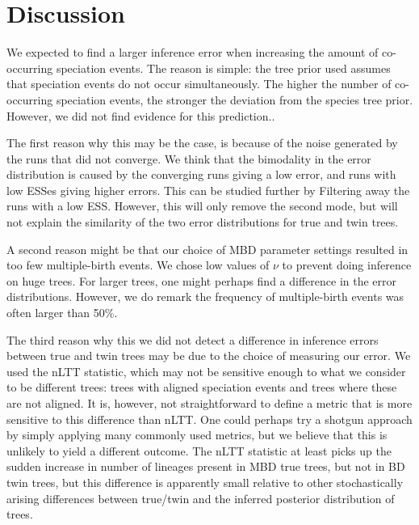 \section{Discussion}

We expected to find a larger inference error 
when increasing the amount of co-occurring speciation events. The reason is simple: the tree prior used assumes that speciation events do not occur simultaneously. The higher the number of co-occurring speciation events, the stronger
the deviation from the species tree prior. However, we did not find evidence for this prediction..

The first reason why this may be the case, is because of the noise
generated by the runs that did not converge. We think that the bimodality
in the error distribution is caused by the converging runs giving a low error, and runs with low ESSes giving higher errors. This can be studied further by Filtering away
the runs with a low ESS. However, this will only remove the second mode, but will not explain the similarity of the two error distributions for true and twin trees.

A second reason might be that our choice of MBD parameter settings resulted
in too few multiple-birth events. We chose low values of $\nu$ to
prevent doing inference on huge trees. For larger trees, one might perhaps find a difference in the error distributions. However, we do remark the frequency of multiple-birth events was often larger than 50\%.

The third reason why this we did not detect a difference in inference errors between true and twin trees may
be due to the choice of measuring our error. We used the nLTT
statistic, which may not be sensitive enough to what we consider to be different trees: trees with aligned speciation events and trees where these are not aligned. It is, however, not straightforward to define a metric that is more sensitive to this difference than nLTT. One could perhaps try a shotgun approach by simply applying many commonly used metrics, but we believe that this is unlikely to yield a different outcome. The nLTT statistic at least picks up the sudden increase in number of lineages present in MBD true trees, but not in BD twin trees, but this difference is apparently small relative to other stochastically arising differences between true/twin and the inferred posterior distribution of trees. 

